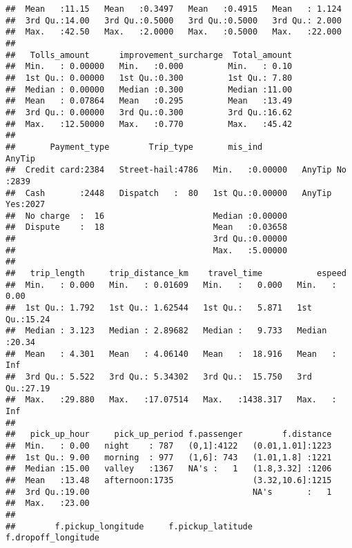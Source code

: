 \documentclass[]{article}
\begin{document}
\begin{verbatim}
##  Mean   :11.15   Mean   :0.3497   Mean   :0.4915   Mean   : 1.124  
##  3rd Qu.:14.00   3rd Qu.:0.5000   3rd Qu.:0.5000   3rd Qu.: 2.000  
##  Max.   :42.50   Max.   :2.0000   Max.   :0.5000   Max.   :22.000  
##                                                                    
##   Tolls_amount      improvement_surcharge  Total_amount  
##  Min.   : 0.00000   Min.   :0.000         Min.   : 0.10  
##  1st Qu.: 0.00000   1st Qu.:0.300         1st Qu.: 7.80  
##  Median : 0.00000   Median :0.300         Median :11.00  
##  Mean   : 0.07864   Mean   :0.295         Mean   :13.49  
##  3rd Qu.: 0.00000   3rd Qu.:0.300         3rd Qu.:16.62  
##  Max.   :12.50000   Max.   :0.770         Max.   :45.42  
##                                                          
##       Payment_type        Trip_type       mis_ind               AnyTip    
##  Credit card:2384   Street-hail:4786   Min.   :0.00000   AnyTip No :2839  
##  Cash       :2448   Dispatch   :  80   1st Qu.:0.00000   AnyTip Yes:2027  
##  No charge  :  16                      Median :0.00000                    
##  Dispute    :  18                      Mean   :0.03658                    
##                                        3rd Qu.:0.00000                    
##                                        Max.   :5.00000                    
##                                                                           
##   trip_length     trip_distance_km    travel_time           espeed     
##  Min.   : 0.000   Min.   : 0.01609   Min.   :   0.000   Min.   : 0.00  
##  1st Qu.: 1.792   1st Qu.: 1.62544   1st Qu.:   5.871   1st Qu.:15.24  
##  Median : 3.123   Median : 2.89682   Median :   9.733   Median :20.34  
##  Mean   : 4.301   Mean   : 4.06140   Mean   :  18.916   Mean   :  Inf  
##  3rd Qu.: 5.522   3rd Qu.: 5.34302   3rd Qu.:  15.750   3rd Qu.:27.19  
##  Max.   :29.880   Max.   :17.07514   Max.   :1438.317   Max.   :  Inf  
##                                                                        
##   pick_up_hour     pick_up_period f.passenger        f.distance  
##  Min.   : 0.00   night    : 787   (0,1]:4122   (0.01,1.01]:1223  
##  1st Qu.: 9.00   morning  : 977   (1,6]: 743   (1.01,1.8] :1221  
##  Median :15.00   valley   :1367   NA's :   1   (1.8,3.32] :1206  
##  Mean   :13.48   afternoon:1735                (3.32,10.6]:1215  
##  3rd Qu.:19.00                                 NA's       :   1  
##  Max.   :23.00                                                   
##                                                                  
##        f.pickup_longitude     f.pickup_latitude      f.dropoff_longitude

\end{verbatim}
\end{document}
